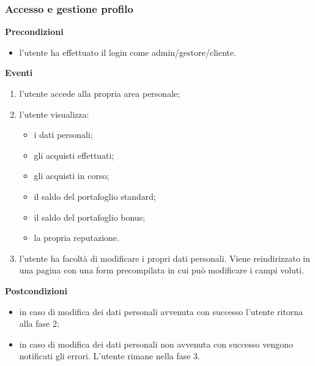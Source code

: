 \documentclass[a4paper, 14pt]{article}
\begin{document}
\begin{flushleft}
			\subsubsection{Accesso e gestione profilo}
			\textbf{Precondizioni}
			\begin{itemize}
				\item l'utente ha effettuato il login come admin/gestore/cliente.
			\end{itemize}
			\textbf{Eventi}
			\begin{enumerate}
				\item l'utente accede alla propria area personale;
				\item l'utente visualizza:
					\begin{itemize}
						\item i dati personali;
						\item gli acquisti effettuati;
						\item gli acquisti in corso; 
						\item il saldo del portafoglio standard;
						\item il saldo del portafoglio bonus; 
						\item la propria reputazione.
					\end{itemize} 
				\item l'utente ha facoltà di modificare i propri dati personali. Viene reindirizzato 
					  in una pagina con una form precompilata in cui può modificare i campi voluti.
			\end{enumerate}
			\textbf{Postcondizioni}
			\begin{itemize}
				\item in caso di modifica dei dati personali avvenuta con successo l'utente ritorna alla fase 2;
				\item in caso di modifica dei dati personali non avvenuta con successo vengono notificati gli errori. L'utente rimane nella fase 3.
			\end{itemize}
		
			\bigskip

\end{flushleft}
\end{document}

